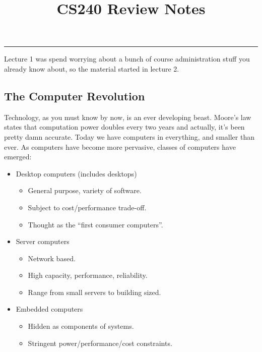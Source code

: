 \documentclass[12pt, twoside, exarticle]{article}
\title{\textbf{CS240 Review Notes}}
\begin{document}
\makeatletter
\hfil\parbox[t]{0.7\textwidth}{\centering\LARGE\bfseries\@title}\par
\kern0.5cm \hrule\kern0.5cm
\makeatother

\renewcommand{\contentsname}{Table of Contents}
\tableofcontents
\clearpage

\setlength{\oddsidemargin}{1.6cm}
\setlength{\evensidemargin}{\oddsidemargin}
\setlength{\marginparwidth}{2.6cm}
\setlength{\marginparsep}{0.25cm}


Lecture 1 was spend worrying about a bunch of course administration stuff you already know about, so the material started in lecture 2. \\

\subsection{The Computer Revolution}

Technology, as you must know by now, is an ever developing beast.  Moore's law states that computation power doubles every two years and actually, it's been pretty damn accurate.  Today we have computers in everything, and smaller than ever.  As computers have become more pervasive, classes of computers have emerged:
\begin{itemize}
\item Desktop computers (includes desktops)
	\begin{itemize}
	\item General purpose, variety of software.
	\item Subject to cost/performance trade-off.
	\item Thought as the ``first consumer computers''.
	\end{itemize}
\item Server computers
	\begin{itemize}
	\item Network based.
	\item High capacity, performance, reliability.
	\item Range from small servers to building sized.
	\end{itemize}
\item Embedded computers
	\begin{itemize}
	\item Hidden as components of systems.
	\item Stringent power/performance/cost constraints.
	\end{itemize}
\end{itemize}
\end{document}
